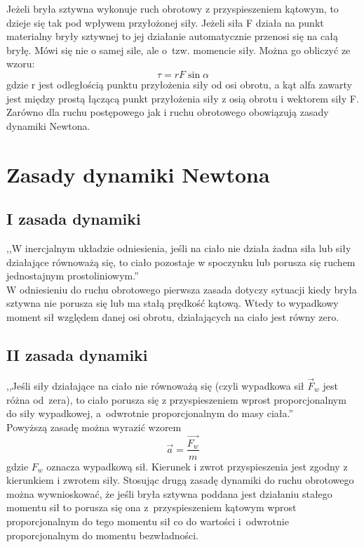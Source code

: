 Jeżeli bryła sztywna wykonuje ruch obrotowy z przyspieszeniem kątowym, to dzieje się tak pod wpływem przyłożonej siły. Jeżeli siła F działa na punkt materialny bryły sztywnej to jej działanie automatycznie przenosi się na całą bryłę. Mówi się nie o samej sile, ale o~tzw. momencie siły. Można go obliczyć ze wzoru:
\begin{equation}\tau=rF\sin\alpha\end{equation}
gdzie r jest odległością punktu przyłożenia siły od osi obrotu, a kąt alfa zawarty jest między prostą łączącą punkt przyłożenia siły z osią obrotu i wektorem siły F.\\
Zarówno dla ruchu postępowego jak i ruchu obrotowego obowiązują zasady dynamiki Newtona.
\section{Zasady dynamiki Newtona}
\subsection{I zasada dynamiki}
,,W inercjalnym układzie odniesienia, jeśli na ciało nie działa żadna siła lub siły działające równoważą się, to ciało pozostaje w spoczynku lub porusza się ruchem jednostajnym prostoliniowym.''\cite{wiki3}\\ 
W odniesieniu do ruchu obrotowego pierwsza zasada dotyczy sytuacji kiedy bryła sztywna nie porusza się lub ma stałą prędkość kątową. Wtedy to wypadkowy moment sił względem danej osi obrotu, działających na ciało jest równy zero.
\subsection{II zasada dynamiki}
,,Jeśli siły działające na ciało nie równoważą się (czyli wypadkowa sił $\vec{F}_{w}$ jest różna od~zera), to ciało porusza się z przyspieszeniem wprost proporcjonalnym do siły wypadkowej, a~odwrotnie proporcjonalnym do masy ciała.''\cite{wiki3}\\
Powyższą zasadę można wyrazić wzorem
\begin{equation}\vec{a}=\frac{\vec{F_w}}{m}\end{equation}
gdzie $F_w$ oznacza wypadkową sił. Kierunek i zwrot przyspieszenia jest zgodny z kierunkiem i zwrotem siły. 
Stosując drugą zasadę dynamiki do ruchu obrotowego można wywnioskować, że jeśli bryła sztywna poddana jest działaniu stałego momentu sił to porusza się ona z~przyspieszeniem kątowym wprost proporcjonalnym do tego momentu sił co do wartości i~odwrotnie proporcjonalnym do momentu bezwładności.

